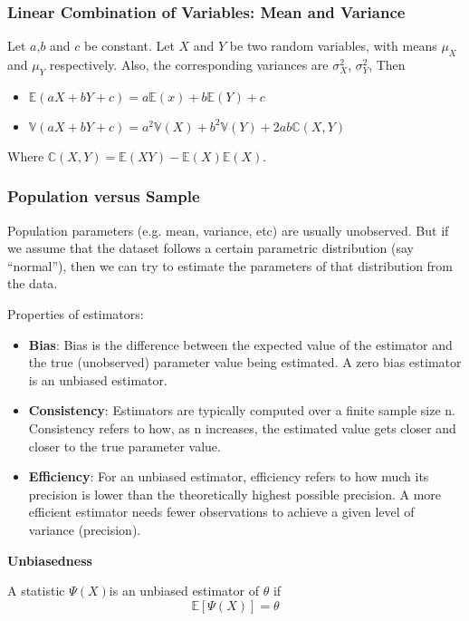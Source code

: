 \subsubsection{Linear Combination of Variables: Mean and Variance}
Let $a$,$b$ and $c$ be constant. Let $X$ and $Y$ be two random variables, with means $\mu_X$ and $\mu_Y$ respectively. Also, the corresponding variances are $\sigma_X^2$, $\sigma_Y^2$, Then

\begin{itemize}
    \item $\mathbb{E}(aX+bY+c) = a\mathbb{E}(x) + b\mathbb{E}(Y) + c$
    \item $\mathbb{V}(aX+bY+c) = a^2\mathbb{V}(X) + b^2\mathbb{V}(Y) +2ab\mathbb{C}(X,Y)$
\end{itemize}

Where $\mathbb{C}(X,Y) = \mathbb{E}(XY) - \mathbb{E}(X)\mathbb{E}(X)$.

\subsubsection{Population versus Sample}
Population parameters (e.g. mean, variance, etc) are usually unobserved. But if we assume that the dataset follows a certain parametric distribution (say “normal”), then we can try to estimate the parameters of that distribution from the data.

Properties of estimators:
\begin{itemize}
    \item \textbf{Bias}: Bias is the difference between the expected value of the estimator and the true (unobserved) parameter value being estimated. A zero bias estimator is an unbiased estimator.
    \item \textbf{Consistency}: Estimators are typically computed over a finite sample size n. Consistency refers to how, as n increases, the estimated value gets closer and closer to the true parameter value.
    \item \textbf{Efficiency}: For an unbiased estimator, efficiency refers to how much its precision is lower than the theoretically highest possible precision. A more efficient estimator needs fewer observations to achieve a given level of variance (precision).
\end{itemize}

\textbf{Unbiasedness}

A statistic $\Psi(X)$is an unbiased estimator of $\theta$ if
\[
    \mathbb{E}[\Psi(X)] = \theta
\]


